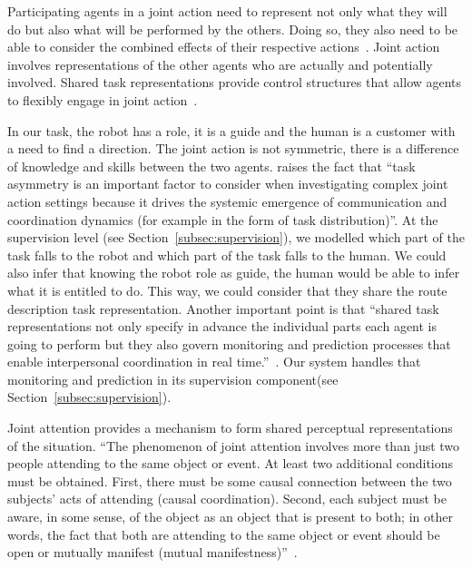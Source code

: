 \documentclass[a4paper,11pt,twoside]{StyleThese}
\begin{document}
Participating agents in a joint action need to represent not only what they will do but also what will be performed by the others. Doing so, they also need to be able to consider the combined effects of their respective actions~\cite{pacherie_2012_agency}. Joint action involves representations of the other agents who are actually and potentially involved. Shared task representations provide control structures that allow agents to flexibly engage in joint action~\cite{knoblich_2011_joint}.

In our task, the robot has a role, it is a guide and the human is a customer with a need to find a direction. The joint action is not symmetric, there is a difference of knowledge and skills between the two agents. \cite{curioni_2019_joint} raises the fact that ``task asymmetry is an important factor to consider when investigating complex joint action settings because it drives the systemic emergence of communication and coordination dynamics (for example in the form of task distribution)''. At the supervision level (see Section~\ref{subsec:supervision}), we modelled which part of the task falls to the robot and which part of the task falls to the human. We could also infer that knowing the robot role as guide, the human would be able to infer what it is entitled to do. This way, we could consider that they share the route description task representation. 
Another important point is that ``shared task representations not only specify in advance the individual parts each agent is going to perform but they also govern monitoring and prediction processes that enable interpersonal coordination in real time.''~\cite{knoblich_2011_joint}. Our system handles that monitoring and prediction in its supervision component(see Section~\ref{subsec:supervision}).


Joint attention provides a mechanism to form shared perceptual representations of the situation. ``The phenomenon of joint attention involves more than just two people attending to the same object or event. At least two additional conditions must be obtained. First, there must be some causal connection between the two subjects’ acts of attending (causal coordination). Second, each subject must be aware, in some sense, of the object as an object that is present to both; in other words, the fact that both are attending to the same object or event should be open or mutually manifest (mutual manifestness)''~\cite[p.~355]{pacherie_2012_agency}.
\end{document}
